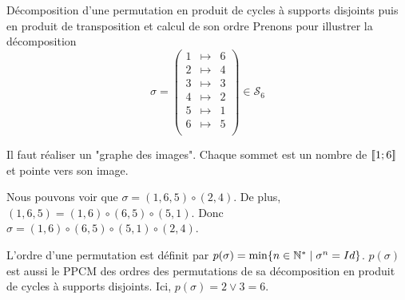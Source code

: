 \documentclass{article}
\begin{document}
\begin{question_kholle}
	{Décomposition d'une permutation en produit de cycles à supports disjoints puis en produit de transposition et calcul de son ordre}
	Prenons pour illustrer la décomposition
	\begin{equation*}
		\sigma = \begin{pmatrix}
			1 &\mapsto& 6 \\
			2 &\mapsto& 4 \\
			3 &\mapsto& 3 \\
			4 &\mapsto& 2 \\
			5 &\mapsto& 1 \\
			6 &\mapsto& 5 \\
		\end{pmatrix}
		\in \mathcal{S}_6
	\end{equation*}
	
	Il faut réaliser un "graphe des images". Chaque sommet est un nombre de $[\![ 1; 6 ]\!]$ et pointe vers son image.
	
	\begin{figure}[H]
		\centering
	\end{figure}
	
	Nous pouvons voir que $\sigma = (1, 6, 5) \circ (2, 4)$.
	De plus, $(1, 6, 5) = (1, 6) \circ (6, 5) \circ (5, 1)$.
	Donc $\sigma = (1, 6) \circ (6, 5) \circ (5, 1) \circ (2, 4)$.
	
	L'ordre d'une permutation est définit par $p(\sigma) = \min \{ n \in \mathbb N^* \;|\; \sigma^n = Id \}$. $p(\sigma)$ est aussi le PPCM des ordres des permutations de sa décomposition en produit de cycles à supports disjoints. Ici, $p(\sigma) = 2 \vee 3 = 6$.
\end{question_kholle}
\end{document}
